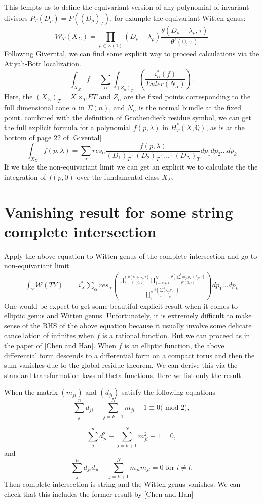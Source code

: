 \documentclass[11pt]{article}
\begin{document}
This tempts us to define the equivariant version of any polynomial of invariant divisors $P_T(D_\rho)=P((D_\rho)_T)$, for example the equivariant Witten genus:
$$
\mathcal{W}_T(X_\Sigma)=\prod_{\rho\in \Sigma(1)}(D_\rho-\lambda_\rho) \frac{\theta(D_\rho-\lambda_\rho,\tau)}{\theta'(0,\tau)}
$$
Following Giverntal, we can find some explicit way to proceed calculations via the Atiyah-Bott localization.
$$
\int_{X_{\Sigma}} f=\sum_\alpha\int_{(Z_\alpha)_T}\left(\frac{i_{\alpha}^*(f)}{Euler(N_\alpha)}\right).
$$
Here, the $(X_{\Sigma})_T=X\times_T ET$ and $Z_\alpha$ are the fixed points corresponding to the full dimensional cone $\alpha$ in $\Sigma(n)$, and $N_\alpha$ is the normal bundle at the fixed point. combined with the definition of Grothendieck residue symbol, we can get the full explicit formula for a polynomial $f(p,\lambda)$ in $H_T^*(X,\mathbb{Q})$, as is at the bottom of page 22 of [Givental]
$$
\int_{X_\Sigma} f(p,\lambda)=\sum_\alpha res_\alpha \frac{f(p,\lambda)}{(D_1)_T\cdot (D_2)_T\cdot ...\cdot (D_N)_T} d p_1 dp_2...dp_k
$$
If we take the non-equivariant limit we can get an explicit we to calculate the the integration of $f(p,0)$ over the fundamental class $X_\Sigma$.

\section{Vanishing result for some string complete intersection}
Apply the above equation to Witten genus of the complete intersection and go to non-equivariant limit
$$
\begin{aligned}
\int_{Y} \mathcal{W}(TY) 
& =i_X^*\sum_\alpha res_\alpha\left(\frac{\prod_i^k \frac{\theta(p_i+\lambda_i,\tau)}{\theta'(0,\tau)}\prod_{j=k+1}^N \frac{\theta(\sum_s^k m_{js}p_s+\lambda_j,\tau)}{\theta'(0,\tau)}}{\prod_{q}^n \frac{\theta(\sum_j^k d_{q j} p_j,\tau)}{\theta'(0,\tau)}}\right)dp_1...dp_k
\end{aligned}
$$
One would be expect to get some beautiful explicit result when it comes to elliptic genus and Witten genus. Unfortunately,  it is extremely difficult to make sense of the RHS of the above equation because it usually involve some delicate cancellation of infinites when $f$ is a rational function. But we can proceed as in the paper of [Chen and Han]. When $f$ is an elliptic function, the above differential form descends to a differential form on a compact torus and then the sum vanishes due to the global residue theorem. We can derive this via the standard transformation laws of theta functions. Here we list only the result.

When the matrix $(m_{ji})$ and $(d_{ji})$ satisfy the following equations
$$
\sum_j^n d_{ji}-\sum_{j=k+1}^N m_{ji}-1\equiv 0\text{(   mod  2)},
$$

$$
\sum_j^n d_{ji}^2-\sum_{j=k+1}^N m_{ji}^2-1=0,
$$
and
$$
\sum_j^n d_{ji} d_{j l}-\sum_{j=k+1}^N m_{ji}m_{j l}=0 \text{  for } i\neq l.
$$
Then complete intersection is string and the Witten genus vanishes.
We can check that this includes the former result by [Chen and Han]

\end{document}
